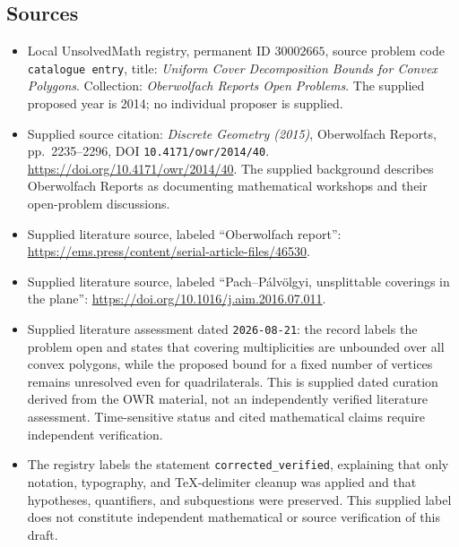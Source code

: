\documentclass[11pt]{article}
\begin{document}
\subsection{Sources}
\begin{itemize}
\item Local UnsolvedMath registry, permanent ID \(30002665\), source problem code \texttt{catalogue entry}, title: \emph{Uniform Cover Decomposition Bounds for Convex Polygons}. Collection: \emph{Oberwolfach Reports Open Problems}. The supplied proposed year is 2014; no individual proposer is supplied.
\item Supplied source citation: \emph{Discrete Geometry (2015)}, Oberwolfach Reports, pp.\ 2235--2296, DOI \texttt{10.4171/owr/2014/40}. \url{https://doi.org/10.4171/owr/2014/40}. The supplied background describes Oberwolfach Reports as documenting mathematical workshops and their open-problem discussions.
\item Supplied literature source, labeled ``Oberwolfach report'': \url{https://ems.press/content/serial-article-files/46530}.
\item Supplied literature source, labeled ``Pach--P\'{a}lv\"{o}lgyi, unsplittable coverings in the plane'': \url{https://doi.org/10.1016/j.aim.2016.07.011}.
\item Supplied literature assessment dated \texttt{2026-08-21}: the record labels the problem open and states that covering multiplicities are unbounded over all convex polygons, while the proposed bound for a fixed number of vertices remains unresolved even for quadrilaterals. This is supplied dated curation derived from the OWR material, not an independently verified literature assessment. Time-sensitive status and cited mathematical claims require independent verification.
\item The registry labels the statement \texttt{corrected\_verified}, explaining that only notation, typography, and TeX-delimiter cleanup was applied and that hypotheses, quantifiers, and subquestions were preserved. This supplied label does not constitute independent mathematical or source verification of this draft.
\end{itemize}
\end{document}
